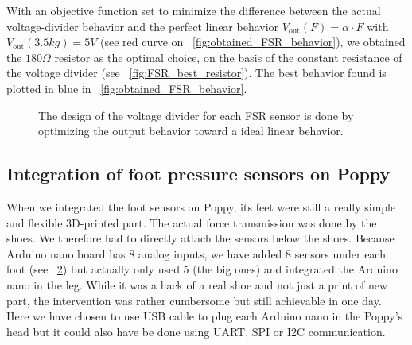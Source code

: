 With an objective function set to minimize the difference between the actual voltage-divider behavior and the perfect linear behavior $V_\mathrm{out}(F) = \alpha \cdot F$ with $V_\mathrm{out}(3.5kg) = 5V$ (see red curve on \figurename~\ref{fig:obtained_FSR_behavior}), we obtained the $180\Omega$ resistor as the optimal choice, on the basis of the constant resistance of the voltage divider (see \figurename~\ref{fig:FSR_best_resistor}). The best behavior found is plotted in blue in \figurename~\ref{fig:obtained_FSR_behavior}.

\begin{figure}[h]
\centering
    \hfil
    \caption{The design of the voltage divider for each FSR sensor is done by optimizing the output behavior toward a ideal linear behavior.}
    \label{fig:foot_sensor_behavior}
\end{figure}



\subsection{Integration of foot pressure sensors on Poppy} %

When we integrated the foot sensors on Poppy, its feet were still a really simple and flexible 3D-printed part. The actual force transmission was done by the shoes. We therefore had to directly attach the sensors below the shoes. Because Arduino nano board has 8 analog inputs, we have added 8 sensors under each foot (see \figurename~\ref{fig:poppy_foot_sensors}) but actually only used 5 (the big ones) and integrated the Arduino nano in the leg. While it was a hack of a real shoe and not just a print of new part, the intervention was rather cumbersome but still achievable in one day. Here we have chosen to use USB cable to plug each Arduino nano in the Poppy's head but it could also have be done using UART, SPI or I2C communication.

\begin{figure}[h]
\centering
    \hfil
    \caption{}
    \label{fig:poppy_foot_sensors}
\end{figure}


